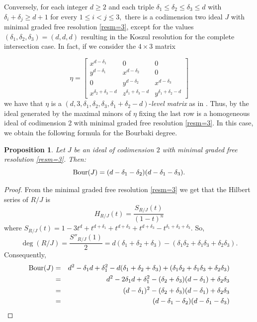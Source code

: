 \documentclass[11pt]{amsart} %
\newtheorem{Proposition}[Theorem]{Proposition}
\theoremstyle{definition}
\begin{document}
 Conversely, for each integer $d\geq 2$ and each triple $\delta_1\leq \delta_2\leq \delta_3\leq d$ with $\delta_i+\delta_j\geq d+1$ for every $1\leq i<j\leq 3,$ there is a codimension two ideal $J$ with minimal graded free resolution \eqref{resm=3}, except for the values $(\delta_1, \delta_2, \delta_3)=(d,d,d)$ resulting in the Koszul resolution for the complete intersection case.   In fact, if we consider the $4\times 3$ matrix
 
 $$\eta=\left[\begin{matrix}
x^{d-\delta_1}&0&0\\
y^{d-\delta_1}&x^{d-\delta_2}&0\\
0&y^{d-\delta_2}&x^{d-\delta_3}\\
x^{\delta_2+\delta_3-d}&z^{\delta_1+\delta_3-d}&y^{\delta_1+\delta_2-d} 
\end{matrix}\right]$$
we have that $\eta$ is a $(d,3,\delta_1,\delta_2,\delta_3,\delta_1+\delta_2-d)$-{\it level matrix} as in \cite[Definition 1.2]{BFRS}. Thus, by \cite[Theorem 1.3]{BFRS} the ideal generated by the maximal minors of $\eta$ fixing the last row is a homogeneous ideal of codimension 2 with minimal graded free resolution \eqref{resm=3}. In this case, we obtain the following formula for the Bourbaki degree. 

\begin{Proposition}\label{Bourm=3} Let $J$ be an ideal of codimension $2$ with minimal graded free resolution \eqref{resm=3}. Then: $${\rm Bour}(J)=(d-\delta_1-\delta_2)(d-\delta_1-\delta_3).$$
\end{Proposition}
 \begin{proof}
 From the  minimal graded free resolution  \eqref{resm=3} we get that the Hilbert series of $R/J$ is
$$H_{R/J}(t)=\frac{ S_{R/J}(t)}{(1-t)^n}$$
where $S_{R/J}(t)= 1-3t^d+t^{d+\delta_1}+ t^{d+\delta_2}+t^{d+\delta_3}-t^{\delta_1+\delta_2+\delta_3}$. So, 
$$\deg(R/J)=\frac{S''_{R/J}(1)}{2}=d(\delta_1+\delta_2+\delta_3)-(\delta_1\delta_2+\delta_1\delta_3+\delta_2\delta_3).$$
Consequently,
\begin{eqnarray}
{\rm Bour}(J)&=&d^2-\delta_1d+\delta_1^2-d(\delta_1+\delta_2+\delta_3)+(\delta_1\delta_2+\delta_1\delta_3+\delta_2\delta_3)\nonumber\\
&=& d^2-2\delta_1d+\delta_1^2-(\delta_2+\delta_3)(d-\delta_1)+\delta_2\delta_3\nonumber\\
&=&(d-\delta_1)^2-(\delta_2+\delta_3)(d-\delta_1)+\delta_2\delta_3\nonumber\\
&=&(d-\delta_1-\delta_2)(d-\delta_1-\delta_3)\nonumber
\end{eqnarray}
\end{proof}
\end{document}
